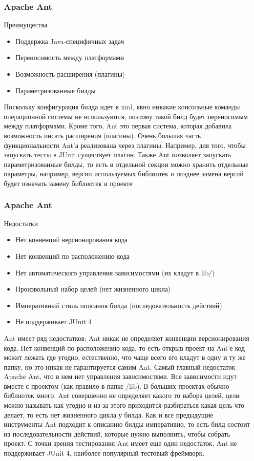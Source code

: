 \documentclass{../industrial-development}
\begin{document}
\begin{frame} \frametitle{Apache Ant}
	\begin{block}{Преимущества}
	\begin{itemize}
		\item Поддержка Java-специфичных задач
		\item Переносимость между платформами
		\item Возможность расширения (плагины)
		\item Параметризованные билды
	\end{itemize}
	\end{block}
\end{frame}
\lecturenotes
Поскольку конфигурация билда идет в xml, явно никакие консольные команды операционной системы не используются, поэтому такой билд будет переносимым между платформами. Кроме того, Ant это первая система, которая добавила возможность писать расширения (плагины). Очень большая часть функциональности Ant'а реализована через плагины. Например, для того, чтобы запускать тесты в JUnit существует плагин. Также Ant позволяет запускать параметризованные билды, то есть в отдельной секции можно хранить отдельные параметры, например, версии используемых библиотек и позднее замена версий будет означать замену библиотек в проекте
~\cite{Yandex_Build_Automation}

\begin{frame} \frametitle{Apache Ant}
	\begin{block}{Недостатки}
		\begin{itemize}
			\item Нет конвенций версионирования кода
			\item Нет конвенций по расположению кода
			\item Нет автоматического управления
			зависимостями (их кладут в lib/)
			\item Произвольный набор целей (нет жизненного
			цикла)
			\item Императивный стиль описания билда
			(последовательность действий)
			\item Не поддерживает JUnit 4
		\end{itemize}
	\end{block}	
\end{frame}
\lecturenotes
Ant имеет ряд недостатков:
Ant никак не определяет конвенции версионирования кода.
Нет конвенций по расположению кода, то есть открыв проект на Ant'е код может лежать где угодно, естественно, что чаще всего его кладут в одну и ту же папку, но это никак не гарантируется самим Ant.
Самый главный недостаток Apache Ant, что в нем нет управления зависимостями. Все зависимости идут вместе с проектом (как правило в папке /lib). В больших проектах обычно библиотек много.
Ant совершенно не определяет какого то набора целей, цели можно называть как угодно и из-за этого приходится разбираться какая цель что делает, то есть нет жизненного цикла у билда.
Как и все предыдущие инструменты Ant подходит к описанию билды императивно, то есть билд состоит из последовательности действий, которые нужно выполнить, чтобы собрать проект.
С точки зрения тестирования Ant имеет еще один недостаток, Ant не поддерживает JUnit 4, наиболее популярный тестовый фреймворк.
~\cite{Yandex_Build_Automation}
\end{document}

